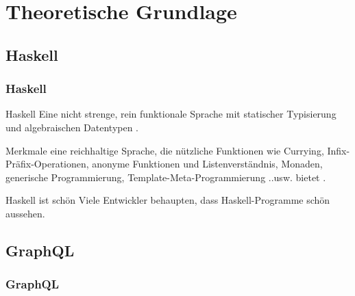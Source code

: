 
\section{Theoretische Grundlage}

\subsection{Haskell}
\begin{frame}{}
    \frametitle{Haskell}
\end{frame}

\begin{frame}{}

    \footnotesize

    \begin{block}{Haskell}
        Eine \alert{nicht strenge}, \alert{rein funktionale} Sprache mit statischer 
        Typisierung und algebraischen Datentypen \cite{history-of-haskell}.
    \end{block}

    \begin{block}{Merkmale}
        eine reichhaltige Sprache, die nützliche Funktionen wie 
        Currying, Infix-Präfix-Operationen, anonyme Funktionen und
        Listenverständnis, Monaden, 
        generische Programmierung, 
        Template-Meta-Programmierung 
        ..usw. bietet \cite{history-of-haskell}.
    \end{block}

    \begin{block}{Haskell ist schön}
        Viele Entwickler behaupten, dass Haskell-Programme schön aussehen. 
        \cite{history-of-haskell} 
    \end{block}

\end{frame}


\subsection{GraphQL}
\begin{frame}{}
    \frametitle{GraphQL}
\end{frame}


